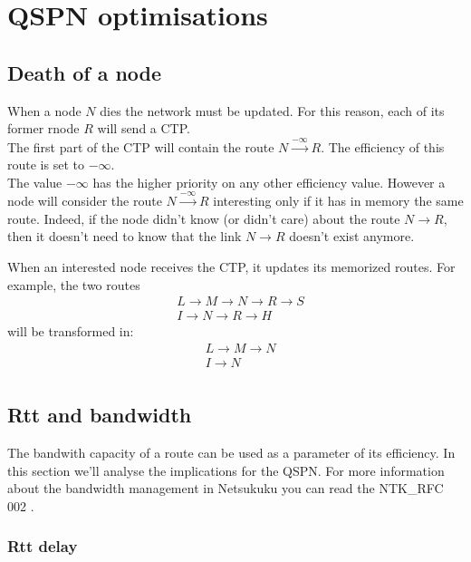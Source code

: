\documentclass[a4paper]{article}
\begin{document}
\section{QSPN optimisations}
\subsection{Death of a node}
When a node $N$ dies the network must be updated. For this reason, each of its former
rnode $R$ will send a CTP.\\
The first part of the CTP will contain the route $N \stackrel{-\infty}{\longrightarrow } R$. The efficiency
of this route is set to $-\infty$.\\

The value $-\infty$ has the higher priority on any other efficiency value.
However a node will consider the route $N \stackrel{-\infty}{\longrightarrow }
R$ interesting only if it has in memory the same route.
Indeed, if the node didn't know (or didn't care) about the route $N
\rightarrow R$, then it doesn't need to know that the link $N\rightarrow R$
doesn't exist anymore.

When an interested node receives the CTP, it updates its memorized routes. For
example, the two routes
\begin{align*}
&L\rightarrow M\rightarrow N \rightarrow R\rightarrow S\\
&I\rightarrow N\rightarrow R\rightarrow H
\end{align*}
will be transformed in:
\begin{align*}
	&L\rightarrow M\rightarrow N\\
	&I\rightarrow N\\
\end{align*}


\subsection{Rtt and bandwidth}
\label{sec:bandwidth_q1q2}

The bandwith capacity of a route can be used as a parameter of its
efficiency. In this section we'll analyse the implications for the QSPN.
For more information about the bandwidth management in Netsukuku you can read
the NTK\_RFC 002 \cite{ntkrfc0002}.

\subsubsection{Rtt delay}
\label{sec:rtt_delay}
\end{document}
